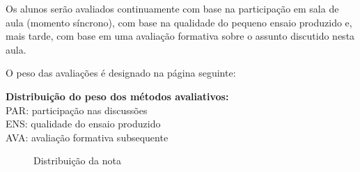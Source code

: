 \documentclass[
	article,			%
	12pt,				%
	twoside,			%
	a4paper,			%
	english,			%
	brazil,				%
	sumario=tradicional
]{abntex2-modelo-plano-de-aula}
\begin{document}


Os alunos serão avaliados continuamente com base na participação em sala de aula (momento síncrono), com base na qualidade do pequeno ensaio produzido e, mais tarde, com base em uma avaliação formativa sobre o assunto discutido nesta aula.

O peso das avaliações é designado na página seguinte:



\vspace{1.5cm}
\newpage
\noindent \textbf{Distribuição do peso dos métodos avaliativos:}\\
PAR: participação nas discussões\\
ENS: qualidade do ensaio produzido\\
AVA: avaliação formativa subsequente

\begin{figure}[htbp]
\centering
{}
\caption{Distribuição da nota}
\end{figure}

\end{document}

